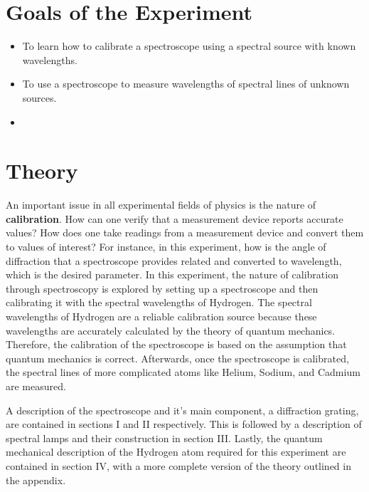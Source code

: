 \section{Goals of the Experiment}
\begin{itemize}
    \item To learn how to calibrate a spectroscope using a spectral source with known wavelengths.
    \item To use a spectroscope to measure wavelengths of spectral lines of unknown sources.
    \item 
\end{itemize}

\section{Theory}
An important issue in all experimental fields of physics is the nature of {\bf calibration}. How can one verify that a measurement device reports accurate values? How does one take readings from a measurement device and convert them to values of interest? For instance, in this experiment, how is the angle of diffraction that a spectroscope provides related and converted to wavelength, which is the desired parameter. In this experiment, the nature of calibration through spectroscopy is explored by setting up a spectroscope and then calibrating it with the spectral wavelengths of Hydrogen. The spectral wavelengths of Hydrogen are a reliable calibration source because these wavelengths are accurately calculated by the theory of quantum mechanics. Therefore, the calibration of the spectroscope is based on the assumption that quantum mechanics is correct. Afterwards, once the spectroscope is calibrated, the spectral lines of more complicated atoms like Helium, Sodium, and Cadmium are measured.

A description of the spectroscope and it's main component, a diffraction grating, are contained in sections I and II respectively. This is followed by a description of spectral lamps and their construction in section III. Lastly, the quantum mechanical description of the Hydrogen atom required for this experiment are contained in section IV, with a more complete version of the theory outlined in the appendix.

